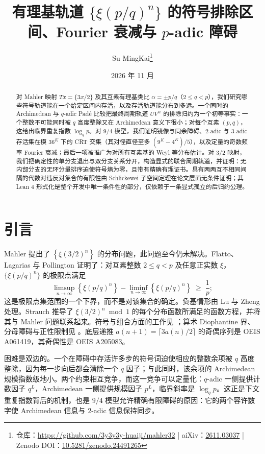 \documentclass[11pt,a4paper]{article}
\title{有理基轨道 \texorpdfstring{$\{\xi(p/q)^{n}\}$}{xi(p/q)^n} 的符号排除区间、Fourier 衰减与 \texorpdfstring{$p$}{p}-adic 障碍}
\author{Su MingKai\thanks{仓库：\url{https://github.com/3y3y3y-huaiji/mahler32} \;|\; aiXiv：\href{https://aixiv.online/abs/2611.03037}{2611.03037} \;|\; Zenodo DOI：\href{https://doi.org/10.5281/zenodo.24491265}{10.5281/zenodo.24491265}}}
\date{2026 年 11 月}
\theoremstyle{remark}
\newcommand{\fract}[1]{\left\{#1\right\}}
\begin{document}
\maketitle

\begin{abstract}
对 Mahler 映射 $T x = \{3x/2\}$ 及其互素有理基类比 $\alpha = \pm p/q$（$2 \le q < p$），我们研究哪些符号轨道能在一个给定区间内存活，以及存活轨道能分布到多远。一个同时的 Archimedean 与 $q$-adic Padé 比较把最终周期轨道 $U V^{w}$ 的排除归约为一个初等事实：一个整数不可能同时被 $q$ 高度整除又在 Archimedean 意义下很小；对每个互素 $(p,q)$，这给出临界重复指数 $\log_{q} p$。对 $9/4$ 模型，我们证明镜像与同余障碍、$2$-adic 与 $3$-adic 存活集在模 $36^{K}$ 下的 CRT 交集（其对径直径至多 $(9^{K} - 4^{K})/5$），以及定量的奇数频率 Fourier 衰减；最后一项被推广为对所有互素基的 Weyl 等分布估计。对 $3/2$ 映射，我们把确定性的单分支退出与双分支关系分开，构造显式的联合周期轨道，并证明：无内部分支的无环分量排序迫使符号熵为零，且带有精确有理证书。具有两两互不相同间隔的代数对违反对集合的有限性由 Schlickewei 子空间定理在论文层面无条件证明；其 Lean 4 形式化是整个开发中唯一条件性的部分，仅依赖于一条显式孤立的后归约公理。
\end{abstract}

\setcounter{tocdepth}{1}
\tableofcontents

\section{引言}
\label{sec:intro}

Mahler \citep{mahler1968} 提出了 $\fract{\xi(3/2)^{n}}$ 的分布问题，此问题至今仍未解决。Flatto、Lagarias 与 Pollington \citep{flp1995} 证明了：对互素整数 $2 \le q < p$ 及任意正实数 $\xi$，$\{\xi(p/q)^{n}\}$ 的极限点满足
\[
  \limsup_{n\to\infty} \fract{\xi(p/q)^{n}} - \liminf_{n\to\infty} \fract{\xi(p/q)^{n}} \;\ge\; \frac{1}{p};
\]
这是极限点集范围的一个下界，而不是对该集合的确定。负基情形由 Lu 与 Zheng \citep{luzheng2026} 处理。Strauch \citep{strauch1997} 推导了 $\xi(3/2)^{n} \bmod 1$ 的每个分布函数所满足的函数方程，并将其与 Mahler 问题联系起来。符号与组合方面的工作见 \citep{lagarias2003,andrieu2025,cassaigne2026}；算术 Diophantine 界、分母障碍与正性限制见 \citep{stephan2026subspace,stephan2026minimal,stephan2026third,cook2026,calegari2025,elmv,dedeo2026}。底层递推 $a(n+1) = \lceil 3a(n)/2 \rceil$ 的奇偶序列是 OEIS A061419，其奇偶性是 OEIS A205083。

困难是双边的。一个在障碍中存活许多步的符号词迫使相应的整数余项被 $q$ 高度整除，因为每一步向后都会清除一个 $q$ 因子；与此同时，该余项的 Archimedean 规模指数级地小。两个约束相互竞争，而这一竞争可以定量化：$q$-adic 一侧提供计数因子 $q^{L}$，Archimedean 一侧提供规模因子 $p^{L}$，临界斜率是 $\log_{q} p$。这正是下文重复指数背后的机制，也是 $9/4$ 模型允许精确有限障碍的原因：它的两个容许数字使 Archimedean 信息与 $2$-adic 信息保持同步。
\end{document}
